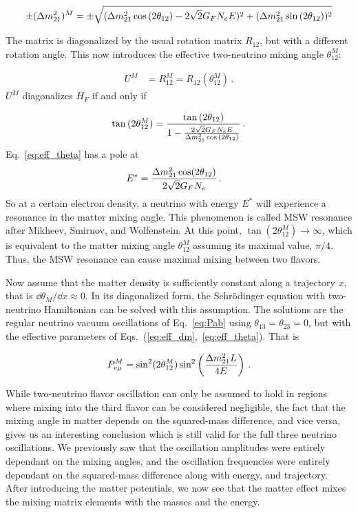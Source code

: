 \begin{align}\label{eq:eff_dm}
    \pm (\dm[21])^M = \pm \sqrt{(\dm[21] \cos{(2\theta_{12}) - 2\sqrt{2}G_F N_e E})^2 + (\dm[21]\sin{(2\theta_{12})})^2}
\end{align}

The matrix is diagonalized by the usual rotation matrix $R_{12}$, but with a different rotation angle. This now introduces the effective two-neutrino mixing angle $\theta_{12}^M$:

\begin{align}
    U^M &= R_{12}^M = R_{12}(\theta_{12}^M)\,.
\end{align}
$U^M$ diagonalizes $H_F$ if and only if 

\begin{align}\label{eq:eff_theta}
    \tan{(2\theta_{12}^M)} = \frac{\tan{(2\theta_{12})}}{1- \frac{2\sqrt{2}G_F N_e E}{\dm[21]\cos{(2\theta_{12})}}}\,.
\end{align}
Eq.~\ref{eq:eff_theta} has a pole at %
\begin{align}\label{eq:MSW}
    E^* &= \frac{\dm[21]\cos(2\theta_{12})}{2\sqrt{2}G_F N_e}\,.
\end{align}
So at a certain electron density, a neutrino with energy $E^*$ will experience a resonance in the matter mixing angle. This phenomenon is called MSW resonance after Mikheev, Smirnov, and Wolfenstein. At this point, $\tan{(2\theta_{12}^M)} \to \infty$, which is equivalent to the matter mixing angle $\theta_{12}^M$ assuming its maximal value, $\pi/4$. Thus, the MSW resonance can cause maximal mixing between two flavors. 

Now assume that the matter density is sufficiently constant along a trajectory $x$, that is $\dd \theta_M / \dd x \approx 0$.
In its diagonalized form, the Schrödinger equation with two-neutrino Hamiltonian can be solved with this assumption. 
The solutions are the regular neutrino vacuum oscillations of Eq.~\ref{eq:Pab} using $\theta_{13} = \theta_{23} =0$, but with the effective parameters of Eqs.~(\ref{eq:eff_dm},~\ref{eq:eff_theta}). That is

\begin{align}
    P_{e\mu}^M = \sin^2(2\theta_{12}^M)\sin^2\left(\frac{\dm[21]L}{4E}\right)\,.
\end{align}


While two-neutrino flavor oscillation can only be assumed to hold in regions where mixing into the third flavor can be considered negligible,
the fact that the mixing angle in matter depends on the squared-mass difference, and vice versa, gives us an interesting conclusion which is 
still valid for the full three neutrino oscillations. We previously saw that the oscillation amplitudes were entirely dependant on
the mixing angles, and the oscillation frequencies were entirely dependant on the squared-mass difference along with energy, and trajectory. After 
introducing the matter potentials, we now see that the matter effect mixes the mixing matrix elements with the masses and the energy. 

